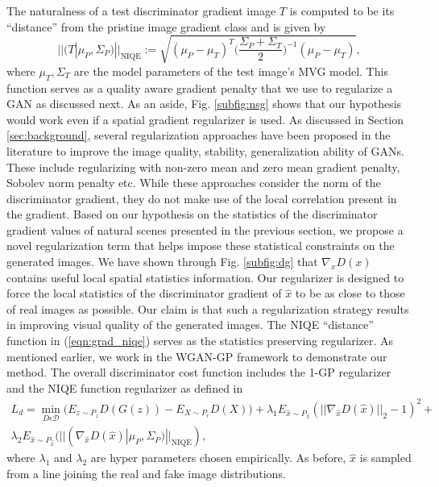\documentclass{article}
\begin{document}
The naturalness of a test discriminator gradient image $T$ is computed to be its ``distance'' from the pristine image gradient class and is given by
\begin{equation}
    ||(T | \mu_P, \Sigma_P)||_{\text{NIQE}} := \sqrt{(\mu_P - \mu_T)^T\bigg(\frac{\Sigma_P + \Sigma_T}{2}\bigg)^{-1}(\mu_P - \mu_T)},
    \label{eqn:grad_niqe}
\end{equation}
where $\mu_T, \Sigma_T$ are the model parameters of the test image's MVG model. 
This function serves as a quality aware gradient penalty that we use to regularize a GAN as discussed next. As an aside, Fig. \ref{subfig:nsg} shows that our hypothesis would work even if a spatial gradient regularizer is used.
As discussed in Section \ref{sec:background}, several regularization approaches have been proposed in the literature to improve the image quality, stability, generalization ability of GANs. These include regularizing with non-zero mean and zero mean gradient penalty, Sobolev norm penalty etc. While these approaches consider the norm of the discriminator gradient, they do not make use of the local correlation present in the gradient.
Based on our hypothesis on the statistics of the discriminator gradient values of natural scenes presented in the previous section, we propose a novel regularization term that helps impose these statistical constraints on the generated images. 
We have shown through Fig. \ref{subfig:dg} that $\nabla_{x} D(x)$ contains useful local spatial statistics information. Our regularizer is designed to force the local statistics of the discriminator gradient of $\hat{x}$ to be as close to those of real images as possible. Our claim is that such a regularization strategy results in improving visual quality of the generated images. The NIQE ``distance'' function in (\ref{eqn:grad_niqe}) serves as the statistics preserving regularizer. As mentioned earlier, we work in the WGAN-GP framework to demonstrate our method. The overall discriminator cost function includes the 1-GP regularizer and the NIQE function regularizer as defined in
\begin{equation}
\begin{split}
    L_{d} = \min_{D \epsilon \mathcal{D}} \bigg( E_{z \sim P_{z}}D(G(z)) - E_{X \sim P_{r}}D(X) \bigg) + \lambda_{1}E_{\hat{x}\sim P_{\hat{x}}}(||\nabla_{\hat{x}} D(\hat{x})||_{2}-1)^{2} +\\ \lambda_{2}E_{\hat{x}\sim P_{\hat{x}}}(||(\nabla_{\hat{x}} D(\hat{x})|\mu_P, \Sigma_P)||_{\text{NIQE}}),
\end{split}
\end{equation}
where $\lambda_{1}$ and $\lambda_{2}$ are hyper parameters chosen empirically. As before, $\hat{x}$ is sampled from a line joining the real and fake image distributions.
\end{document}
